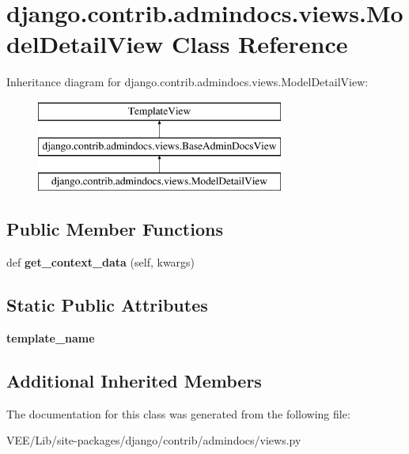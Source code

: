 \hypertarget{classdjango_1_1contrib_1_1admindocs_1_1views_1_1_model_detail_view}{}\section{django.\+contrib.\+admindocs.\+views.\+Model\+Detail\+View Class Reference}
\label{classdjango_1_1contrib_1_1admindocs_1_1views_1_1_model_detail_view}
Inheritance diagram for django.\+contrib.\+admindocs.\+views.\+Model\+Detail\+View\+:\begin{figure}[H]
\begin{center}
\leavevmode
\includegraphics[height=3.000000cm]{classdjango_1_1contrib_1_1admindocs_1_1views_1_1_model_detail_view}
\end{center}
\end{figure}
\subsection*{Public Member Functions}
\begin{DoxyCompactItemize}
\item 
\mbox{\label{classdjango_1_1contrib_1_1admindocs_1_1views_1_1_model_detail_view_a9dd211eb242c78dc06d190cbce6a4954}} 
def {\bfseries get\+\_\+context\+\_\+data} (self, kwargs)
\end{DoxyCompactItemize}
\subsection*{Static Public Attributes}
\begin{DoxyCompactItemize}
\item 
\mbox{\label{classdjango_1_1contrib_1_1admindocs_1_1views_1_1_model_detail_view_a463459e9db3e31b2145371b3a10412c7}} 
{\bfseries template\+\_\+name}
\end{DoxyCompactItemize}
\subsection*{Additional Inherited Members}


The documentation for this class was generated from the following file\+:\begin{DoxyCompactItemize}
\item 
V\+E\+E/\+Lib/site-\/packages/django/contrib/admindocs/views.\+py\end{DoxyCompactItemize}
